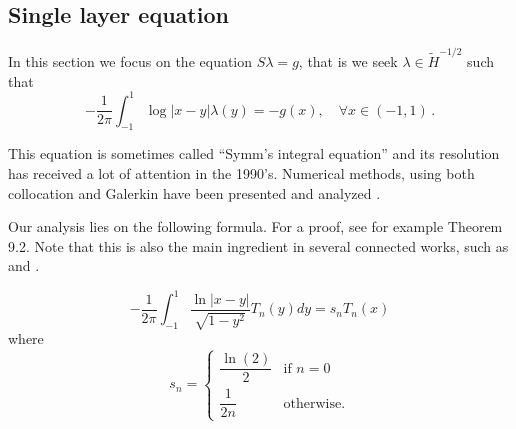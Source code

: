 \documentclass[a4paper]{article}
\begin{document}
\subsection{Single layer equation}

In this section we focus on the equation $S\lambda = g$, that is we seek $\lambda \in \tilde{H}^{-1/2}$ such that 
\begin{equation}
-\frac{1}{2\pi}\int_{-1}^{1} \log|x-y| \lambda(y) = -g(x), \quad \forall x\in (-1,1)\,.\label{Slambda}
\end{equation} 

This equation is sometimes called ``Symm's integral equation'' and its resolution has received a lot of attention in the 1990's. Numerical methods, using both collocation and Galerkin have been presented and analyzed \cite{atkinson1991numerical,yan1988integral,yan1990cosine,sloan1992collocation,yan1989mesh}. 


Our analysis lies on the following formula. For a proof, see for example \cite{mason2002chebyshev} Theorem 9.2. Note that this is also the main ingredient in several connected works, such as \cite{jiang2004second} and \cite{bruno2012second}.

%
%
%
%
\begin{Lem}
	\[ -\frac{1}{2\pi}\int_{-1}^{1} \frac{\ln|x-y|}{\sqrt{1 - y^2}}T_n(y)dy = s_n T_n(x)\]
	where
	\[s_n = \begin{cases}
	\dfrac{\ln(2)}{2} & \text{if } n=0\\
	\dfrac{1}{2n} & \text{otherwise}.
	\end{cases}\]
	\label{STn}
\end{Lem}
\end{document}
